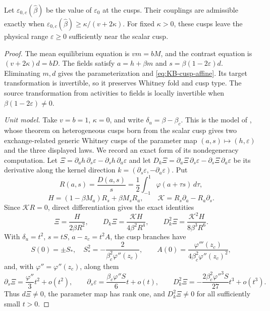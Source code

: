 Let $\varepsilon_{0,c}(\widehat\beta)$ be the value of $\varepsilon_0$ at the cusps. Their
couplings are admissible exactly when $\varepsilon_{0,c}(\widehat\beta)\ge\kappa/(v+2\kappa)$.
For fixed $\kappa>0$, these cusps leave the physical range
$\varepsilon\ge0$ sufficiently near the scalar cusp.
\eeT
\begin{proof}
The mean equilibrium equation is $vm=bM$, and the contrast equation
is $(v+2\kappa)d=bD$. The fields satisfy
$a=h+\beta m$ and $s=\beta(1-2\varepsilon)d$.
Eliminating $m,d$ gives the parameterization and
\eqref{eq:KB-cusp-affine}. Its target transformation is invertible,
so it preserves Whitney fold and cusp type. The source transformation
from activities to fields is locally invertible when
$\beta(1-2\varepsilon)\ne0$.

\emph{Unit model.} Take $v=b=1$, $\kappa=0$, and write
$\delta_u=\beta-\beta_c$. This is the model of \cite{Boud26}, whose theorem on
heterogeneous cusps born from the scalar cusp gives two exchange-related generic Whitney
cusps of the parameter map $(a,s)\mapsto(h,\varepsilon)$ and the three displayed laws.
We record an exact form of its nondegeneracy computation.
Let $\Xi=\partial_ah\,\partial_s\varepsilon-\partial_sh\,\partial_a\varepsilon$
and let $D_k\Xi=\partial_a\Xi\,\partial_s\varepsilon-\partial_s\Xi\,\partial_a\varepsilon$
be its derivative along the kernel direction $k=(\partial_s\varepsilon,-\partial_a\varepsilon)$. Put
\[
 R(a,s)=\frac{D(a,s)}s
       =\frac12\int_{-1}^1\varphi(a+\tau s)\,d\tau,
\]
\[
 H=(1-\beta M_a)R_s+\beta M_sR_a,
 \qquad \mathcal K=R_s\partial_a-R_a\partial_s.
\]
Since $\mathcal K R=0$, direct differentiation gives the exact identities
\[
 \Xi=\frac{H}{2\beta R^2},\qquad
 D_k\Xi=\frac{\mathcal K H}{4\beta^2R^4},\qquad
 D_k^2\Xi=\frac{\mathcal K^2H}{8\beta^3R^6}.
\]
With $\delta_u=t^2$, $s=tS$, $a-z_c=t^2A$, the cusp branches have
\[
 S(0)=\pm S_*,\quad S_*^2=-\frac{2}{\beta_c^2\varphi''(z_c)},\qquad
 A(0)=\frac{\varphi'''(z_c)}{4\beta_c^2\varphi''(z_c)^2},
\]
and, with $\varphi''=\varphi''(z_c)$, along them
\[
 \partial_s\Xi=\frac{\varphi''}{3}t^2+o(t^2),\qquad
 \partial_s\varepsilon=\frac{\beta_c\varphi''S}{6}t+o(t),\qquad
 D_k^2\Xi=-\frac{2\beta_c^2\varphi''^3S}{27}t^3+o(t^3).
\]
Thus $d\Xi\ne0$, the parameter map has rank one, and
$D_k^2\Xi\ne0$ for all sufficiently small $t>0$.


\end{proof}
